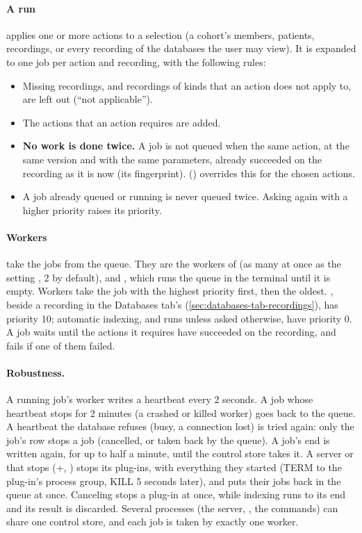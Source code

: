 \paragraph{A run} applies one or more actions to a selection (a cohort's members, patients,
recordings, or every recording of the databases the user may view). It is expanded to one job per action and recording, with
the following rules:
\begin{itemize}
\item Missing recordings, and recordings of kinds that an action does not apply to, are left out
  (``not applicable'').
\item The actions that an action requires are added.
\item \textbf{No work is done twice.} A job is not queued when the same action, at the same
  version and with the same parameters, already succeeded on the recording as it is now (its
  fingerprint).  () overrides this for the
  chosen actions.
\item A job already queued or running is never queued twice. Asking again with a higher
  priority raises its priority.
\end{itemize}

\paragraph{Workers} take the jobs from the queue. They are the workers of 
(as many at once as the setting , 2 by default), and , which
runs the queue in the terminal until it is empty. Workers take the job with the highest priority
first, then the oldest. , beside a recording in the Databases tab's
 (\cref{sec:databases-tab-recordings}), has priority 10; automatic indexing,
and runs unless asked otherwise, have priority 0. A job waits until the actions it requires have
succeeded on the recording, and fails if one of them failed.

\paragraph{Robustness.} A running job's worker writes a heartbeat every 2 seconds. A job whose
heartbeat stops for 2 minutes (a crashed or killed worker) goes back to the queue. A heartbeat
the database refuses (busy, a connection lost) is tried again: only the job's row stops a job
(cancelled, or taken back by the queue). A job's end is written again, for up to half a minute,
until the control store takes it. A server or  that stops (+,
) stops its plug-ins, with everything they started (TERM to the plug-in's process
group, KILL 5 seconds later), and puts their jobs back in the queue at once. Canceling stops a
plug-in at once, while indexing runs to its end and its result is discarded. Several processes
(the server, , the commands) can share one control store, and each job is taken by
exactly one worker.

